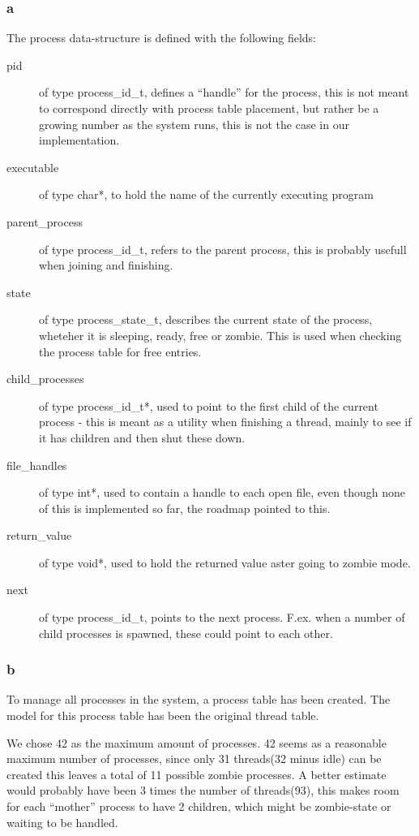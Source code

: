 \documentclass[10pt]{article}
\begin{document}
\subsubsection*{a}
The process data-structure is defined with the following fields:
\begin{description}
\item[pid] of type process\_id\_t, defines a ``handle'' for the process, this
is not meant to correspond directly with process table placement, but rather be
a growing number as the system runs, this is not the case in our implementation.
\item[executable] of type char*, to hold the name of the currently executing 
program
\item[parent\_process] of type process\_id\_t, refers to the parent process,
this is probably usefull when joining and finishing.
\item[state] of type process\_state\_t, describes the current state of the
process, wheteher it is sleeping, ready, free or zombie. This is used when
checking the process table for free entries.
\item[child\_processes] of type process\_id\_t*, used to point to the first
child of the current process - this is meant as a utility when finishing a
thread, mainly to see if it has children and then shut these down.
\item[file\_handles] of type int*, used to contain a handle to each open file,
even though none of this is implemented so far, the roadmap pointed to this.
\item[return\_value] of type void*, used to hold the returned value aster going
to zombie mode.
\item[next] of type process\_id\_t, points to the next process. F.ex. when a
number of child processes is spawned, these could point to each other.
\end{description}

\subsubsection*{b}
To manage all processes in the system, a process table has been created. The
model for this process table has been the original thread table.

We chose 42 as the maximum amount of processes. 42 seems as a reasonable
maximum number of processes, since only 31 threads(32 minus idle) can be 
created this leaves a total of 11 possible zombie processes. A better estimate
would probably have been 3 times the number of threads(93), this makes room for
each ``mother'' process to have 2 children, which might be zombie-state or
waiting to be handled.
\end{document}
